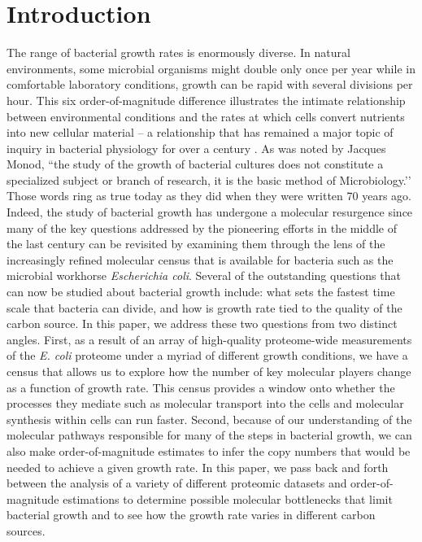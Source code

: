 \section{Introduction}
The range of bacterial growth rates is enormously diverse. In natural
environments, some microbial organisms might double only once per year while
in comfortable laboratory conditions, growth can be rapid with several
divisions per hour. This six order-of-magnitude difference illustrates the
intimate relationship between environmental conditions and the rates at which
cells convert nutrients into new cellular material -- a relationship that has
remained a major topic of inquiry in bacterial physiology for over a century
\citep{jun2018}. As was noted by Jacques Monod, ``the study of the growth of
bacterial cultures does not constitute a specialized subject or branch of
research, it is the basic method of Microbiology.’’ Those words ring as true
today as they did when they were written 70 years ago. Indeed, the study of
bacterial growth has undergone a molecular resurgence since many of the key
questions addressed by the pioneering efforts in the middle of the last
century can be revisited by examining them through the lens of the
increasingly refined molecular census that is available for bacteria such as
the microbial workhorse \textit{Escherichia coli}. Several of the outstanding
questions that can now be studied about bacterial growth include: what sets
the fastest time scale that bacteria can divide, and how is growth rate tied
to the quality of the carbon source. In this paper, we address these two
questions from two distinct angles. First, as a result of an array of
high-quality proteome-wide measurements of the \textit{E. coli} proteome
under a myriad of different growth conditions, we have a census that allows
us to explore how the number of key molecular players change as a function of
growth rate. This census provides a window onto whether the processes they
mediate such as molecular transport into the cells and molecular synthesis
within cells can run faster. Second, because of our understanding of the
molecular pathways responsible for many of the steps in bacterial growth, we
can also make order-of-magnitude estimates to infer the copy numbers that
would be needed to achieve a given growth rate. In this paper, we pass back
and forth between the analysis of a variety of different proteomic datasets
and order-of-magnitude estimations to determine possible molecular
bottlenecks that limit bacterial growth and to see how the growth rate varies
in different carbon sources.

